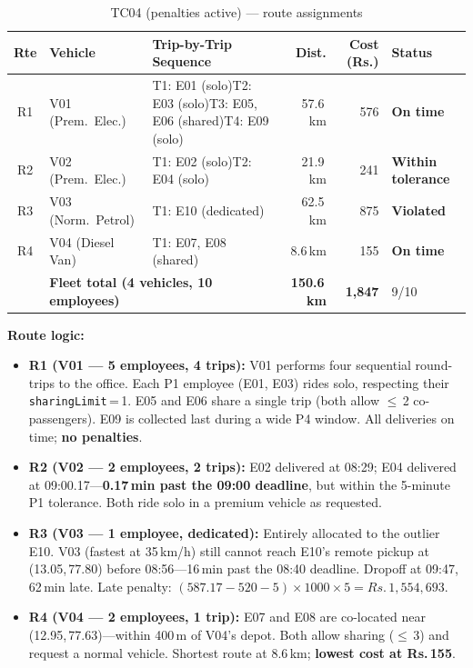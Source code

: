 \documentclass[11pt,a4paper]{article}
\newcommand{\rupee}{Rs.}
\newcommand{\code}[1]{\texttt{#1}}
\newcommand{\statusok}{\textcolor{velgreen}{\textbf{On time}}}
\newcommand{\statustol}{\textcolor{velorange}{\textbf{Within tolerance}}}
\newcommand{\statusviol}{\textcolor{velred}{\textbf{Violated}}}
\newcommand{\cmark}{\textcolor{velgreen}{\ding{51}}}
\begin{document}
\begin{table}[H]
\centering
\caption{TC04 (penalties active) --- route assignments}
\label{tab:tc04-routes-pen}
\small
\renewcommand{\arraystretch}{1.2}
\begin{tabular}{@{}cl >{\raggedright\arraybackslash}p{4.2cm} rrl@{}}
\toprule
\textbf{Rte} & \textbf{Vehicle} & \textbf{Trip-by-Trip Sequence} & \textbf{Dist.} & \textbf{Cost (\rupee)} & \textbf{Status} \\
\midrule
\rowcolor{rowalt}
R1 & V01 (Prem.\ Elec.) & T1: E01 (solo)\newline T2: E03 (solo)\newline T3: E05, E06 (shared)\newline T4: E09 (solo) & 57.6\,km & 576 & \statusok{} \\[4pt]
R2 & V02 (Prem.\ Elec.) & T1: E02 (solo)\newline T2: E04 (solo) & 21.9\,km & 241 & \statustol{} \\[4pt]
\rowcolor{rowalt}
R3 & V03 (Norm.\ Petrol) & T1: E10 (dedicated) & 62.5\,km & 875 & \statusviol{} \\
R4 & V04 (Diesel Van) & T1: E07, E08 (shared) & 8.6\,km & 155 & \statusok{} \\
\midrule
 & \multicolumn{2}{l}{\textbf{Fleet total (4 vehicles, 10 employees)}} & \textbf{150.6\,km} & \textbf{1,847} & 9/10\;\cmark \\
\bottomrule
\end{tabular}
\renewcommand{\arraystretch}{1.0}
\end{table}

\textbf{Route logic:}
\begin{itemize}[nosep, leftmargin=1.2em, itemsep=4pt]
    \item \textbf{R1 (V01 --- 5 employees, 4 trips):} V01 performs four sequential round-trips to the office. Each P1 employee (E01, E03) rides solo, respecting their \code{sharingLimit}\,=\,1. E05 and E06 share a single trip (both allow $\le$\,2 co-passengers). E09 is collected last during a wide P4 window. All deliveries on time; \textbf{no penalties}.
    \item \textbf{R2 (V02 --- 2 employees, 2 trips):} E02 delivered at 08:29; E04 delivered at 09:00.17---\textbf{0.17\,min past the 09:00 deadline}, but within the 5-minute P1 tolerance. Both ride solo in a premium vehicle as requested.
    \item \textbf{R3 (V03 --- 1 employee, dedicated):} Entirely allocated to the outlier E10. V03 (fastest at 35\,km/h) still cannot reach E10's remote pickup at (13.05,\,77.80) before 08:56---16\,min past the 08:40 deadline. Dropoff at 09:47, 62\,min late. Late penalty: $(587.17 - 520 - 5) \times 1000 \times 5 = \rupee\,1{,}554{,}693$.
    \item \textbf{R4 (V04 --- 2 employees, 1 trip):} E07 and E08 are co-located near (12.95,\,77.63)---within 400\,m of V04's depot. Both allow sharing ($\le$\,3) and request a normal vehicle. Shortest route at 8.6\,km; \textbf{lowest cost at \rupee\,155}.
\end{itemize}
\end{document}
